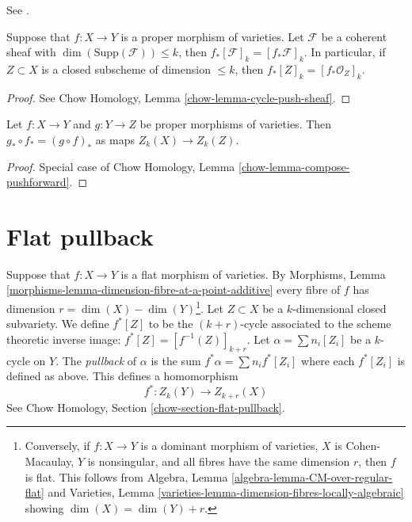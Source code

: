 \begin{lemma}
\label{lemma-push-coherent}
\begin{reference}
See \cite[Chapter V]{Serre_algebre_locale}.
\end{reference}
Suppose that $f : X \to Y$ is a proper morphism of varieties.
Let $\mathcal{F}$ be a coherent sheaf with
$\dim(\text{Supp}(\mathcal{F})) \leq k$, then
$f_*[\mathcal{F}]_k = [f_*\mathcal{F}]_k$. In particular, if
$Z \subset X$ is a closed subscheme of dimension $\leq k$, then
$f_*[Z]_k = [f_*\mathcal{O}_Z]_k$.
\end{lemma}

\begin{proof}
See Chow Homology, Lemma \ref{chow-lemma-cycle-push-sheaf}.
\end{proof}

\begin{lemma}
\label{lemma-compose-pushforward}
Let $f : X \to Y$ and $g : Y \to Z$ be proper morphisms of
varieties. Then $g_* \circ f_* = (g \circ f)_*$ as maps $Z_k(X) \to Z_k(Z)$.
\end{lemma}

\begin{proof}
Special case of Chow Homology, Lemma \ref{chow-lemma-compose-pushforward}.
\end{proof}



\section{Flat pullback}
\label{section-flat-pullback}

\noindent
Suppose that $f : X \to Y$ is a flat morphism of varieties.
By Morphisms, Lemma
\ref{morphisms-lemma-dimension-fibre-at-a-point-additive} 
every fibre of $f$ has dimension $r = \dim(X) - \dim(Y)$\footnote{Conversely,
if $f : X \to Y$ is a dominant morphism of varieties,
$X$ is Cohen-Macaulay, $Y$ is nonsingular, and all fibres have
the same dimension $r$, then $f$ is flat. This follows from
Algebra, Lemma \ref{algebra-lemma-CM-over-regular-flat} and
Varieties, Lemma \ref{varieties-lemma-dimension-fibres-locally-algebraic}
showing $\dim(X) = \dim(Y) + r$.}.
Let $Z \subset X$ be a $k$-dimensional closed subvariety. We define
$f^*[Z]$ to be the $(k + r)$-cycle associated to the scheme theoretic
inverse image: $f^*[Z] = [f^{-1}(Z)]_{k + r}$. Let
$\alpha = \sum n_i [Z_i]$ be a $k$-cycle on $Y$. The {\it pullback} of
$\alpha$ is the sum $f^* \alpha = \sum n_i f^*[Z_i]$ where each $f^*[Z_i]$
is defined as above. This defines a homomorphism
$$
f^* : Z_k(Y) \longrightarrow Z_{k + r}(X)
$$
See Chow Homology, Section \ref{chow-section-flat-pullback}.

